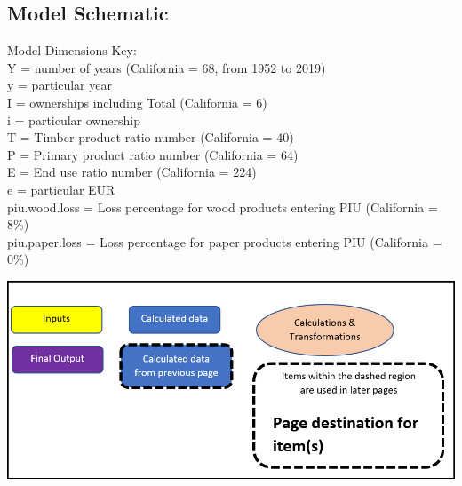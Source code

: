 \documentclass[
  openany]{book}
\begin{document}
\newpage

\hypertarget{model-func-schem}{%
\subsection{Model Schematic}\label{model-func-schem}}

Model Dimensions Key:\\
Y = number of years (California = 68, from 1952 to 2019)\\
y = particular year\\
I = ownerships including Total (California = 6)\\
i = particular ownership\\
T = Timber product ratio number (California = 40)\\
P = Primary product ratio number (California = 64)\\
E = End use ratio number (California = 224)\\
e = particular EUR\\
piu.wood.loss = Loss percentage for wood products entering PIU (California = 8\%)\\
piu.paper.loss = Loss percentage for paper products entering PIU (California = 0\%)

\includegraphics[width=1\linewidth]{images/schematic-0}

\newpage
\end{document}
